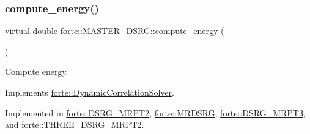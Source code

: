 \subsubsection{\texorpdfstring{compute\+\_\+energy()}{compute\_energy()}}
{\footnotesize\ttfamily virtual double forte\+::\+M\+A\+S\+T\+E\+R\+\_\+\+D\+S\+R\+G\+::compute\+\_\+energy (\begin{DoxyParamCaption}{ }\end{DoxyParamCaption})\hspace{0.3cm}{\ttfamily [pure virtual]}}



Compute energy. 



Implements \mbox{\hyperlink{classforte_1_1_dynamic_correlation_solver_aff4c7ebdca64563939d6e3ab8a262150}{forte\+::\+Dynamic\+Correlation\+Solver}}.



Implemented in \mbox{\hyperlink{classforte_1_1_d_s_r_g___m_r_p_t2_a0884f1a9e8f98eb3c272e9c6518e7691}{forte\+::\+D\+S\+R\+G\+\_\+\+M\+R\+P\+T2}}, \mbox{\hyperlink{classforte_1_1_m_r_d_s_r_g_a6c9a82cec6600ecbf3b2a0b01d946223}{forte\+::\+M\+R\+D\+S\+RG}}, \mbox{\hyperlink{classforte_1_1_d_s_r_g___m_r_p_t3_a48a25a952206690bcf8125e583576052}{forte\+::\+D\+S\+R\+G\+\_\+\+M\+R\+P\+T3}}, and \mbox{\hyperlink{classforte_1_1_t_h_r_e_e___d_s_r_g___m_r_p_t2_af7cee9b490ef09652f35cbfd48f8fe6a}{forte\+::\+T\+H\+R\+E\+E\+\_\+\+D\+S\+R\+G\+\_\+\+M\+R\+P\+T2}}.

\mbox{\label{classforte_1_1_m_a_s_t_e_r___d_s_r_g_ae4f6a58d88aa03439d4c12e56fe90e0b}} 
